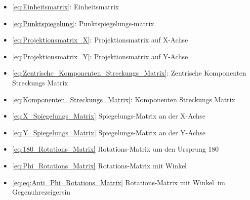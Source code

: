 \begin{multicols}{2}
    \begin{itemize}
        \item \ref{eq:Einheitsmatrix}: Einheitsmatrix
        \item \ref{eq:Punktspiegelung}: Punktspiegelungs-matrix
        \item \ref{eq:Projektionsmatrix_X}: Projektionsmatrix auf X-Achse
        \item \ref{eq:Projektionsmatrix_Y}: Projektionsmatrix auf Y-Achse
        \item \ref{eq:Zentrische_Komponenten_Streckungs_Matrix}: Zentrische Komponenten Streckungs Matrix
        \item \ref{eq:Komponenten_Streckungs_Matrix}: Komponenten Streckungs Matrix
        \item \ref{eq:X_Spiegelungs_Matrix} Spiegelungs-Matrix an der X-Achse
        \item \ref{eq:Y_Spiegelungs_Matrix} Spiegelungs-Matrix an der Y-Achse
        \item \ref{eq:180_Rotations_Matrix} Rotations-Matrix um den Ursprung 180\degree
        \item \ref{eq:Phi_Rotations_Matrix} Rotations-Matrix mit Winkel \varphi
        \item \ref{eq:eq:Anti_Phi_Rotations_Matrix} Rotations-Matrix mit Winkel \varphi \,im Gegenuhrezeigersin
    \end{itemize}
\end{multicols}